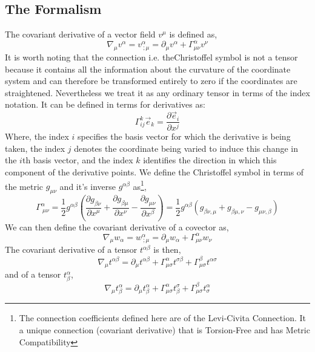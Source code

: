 \subsection{The Formalism}
The covariant derivative of a vector field $v^{\mu}$ is defined as,
\begin{equation}
\nabla_{\mu} v^{\alpha} = v^{\alpha}_{ \  ; \mu} = \partial_{\mu} v^{\alpha} + \Gamma^{\alpha}_{\mu \nu} v^{\nu}
\end{equation}
 It is worth noting that the connection i.e. theChristoffel symbol is not a tensor because it contains all the information about the curvature of the coordinate system and can therefore be transformed entirely to zero if the coordinates are straightened. Nevertheless we treat it as any ordinary tensor in terms of the index notation. It can be defined in terms for derivatives as:
\begin{equation}
\Gamma^{k}_{ij}\vec{e}_{k} = \frac{\partial \vec{e}_{i}}{\partial x^{j}}
\end{equation}
Where, the index $i$ specifies the basis vector for which the derivative is being
taken, the index $j$ denotes the coordinate being varied to induce this change
in the $i$th basis vector, and the index $k$ identifies the direction in which this
component of the derivative points. We define the Christoffel symbol in terms of the metric $g_{\mu \nu}$ and it's inverse $g^{\alpha \beta}$ as\footnote{The connection coefficients defined here are of the Levi-Civita Connection. It a unique connection (covariant derivative) that is Torsion-Free and has Metric Compatibility},
\begin{equation}
\Gamma^{\alpha}_{\ \mu \nu} = \frac{1}{2} g^{\alpha \beta} \left(\frac{\partial g_{\beta \nu}}{\partial x^{\mu}} + \frac{\partial g_{\beta \mu}}{\partial x^{\nu}} - \frac{\partial g_{\mu \nu}}{\partial x^{\beta}}\right) = \frac{1}{2}g^{\alpha \beta} \left(g_{\beta \nu, \mu} + g_{\beta \mu, \nu} - g_{\mu \nu, \beta}\right)
\end{equation}
We can then define the covariant derivative of a covector as,
\begin{equation}
\nabla_{\mu} w_{\alpha} = w^{\alpha}_{ \  ; \mu} = \partial_{\mu} w_{\alpha} + \Gamma^{\alpha}_{\mu \nu} w_{\nu}
\end{equation}
The covariant derivative of a tensor $t^{\alpha\beta}$ is then,
\begin{equation}
\nabla_{\mu}t^{\alpha \beta} = \partial_{\mu} t^{\alpha \beta} + \Gamma^{\alpha}_{\mu \sigma}t^{\sigma \beta} + \Gamma^{\beta}_{\mu \sigma}t^{\alpha \sigma }
\end{equation}
and of a tensor $t^{\alpha}_{\beta}$,
\begin{equation}
\nabla_{\mu}t^{\alpha}_{\beta} = \partial_{\mu} t^{\alpha}_{\beta} + \Gamma^{\alpha}_{\mu \sigma}t^{\sigma}_{\beta} + \Gamma^{\beta}_{\mu \sigma}t^{\alpha}_{\sigma}
\end{equation}